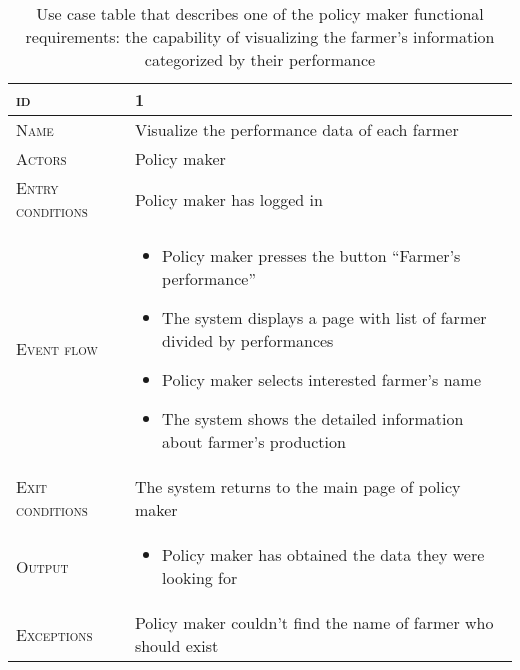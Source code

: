 

\begin{table}[H]
    \centering
    \begin{tabular}{|l|p{}|}
        \hline %
    	\textsc{id}                 &   1\\
    	\hline %
    	\textsc{Name}               &   Visualize the performance data of each farmer\\
    	\hline %
    	\textsc{Actors}             &   Policy maker\\
    	\hline %
    	\textsc{Entry conditions}   &   Policy maker has logged in\\
    	\hline %
    	\textsc{Event flow}         &   %
            	                        \begin{itemize}
                                    	    \item Policy maker presses the button “Farmer’s performance”
                                    		\item The system displays a page with list of farmer divided by performances
                                    		\item Policy maker selects interested farmer’s name
                                    		\item The system shows the detailed information about farmer’s production
                                        \end{itemize}\\
        \hline %
        \textsc{Exit conditions}    &  The system returns to the main page of policy maker\\
    	\hline %
    	\textsc{Output}             &  \begin{itemize}
    	    \item Policy maker has obtained the data they were looking for
    	\end{itemize}\\
    	\hline %
    	\textsc{Exceptions}         &  Policy maker couldn’t find the name of farmer who should exist\\
    	\hline %
        
    \end{tabular}
    \caption{\label{tab:visualize_farmer_performance}Use case table that describes one of the policy maker functional requirements:  the capability of visualizing the farmer's information categorized by their performance} %
\end{table}

